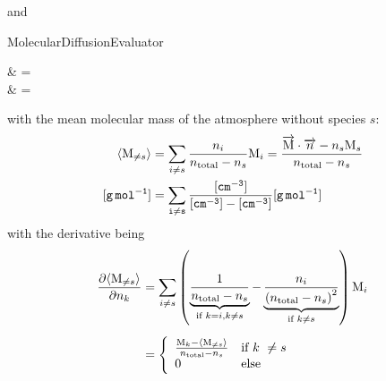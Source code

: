 and
\begin{equationCode}{MolecularDiffusionEvaluator}
\begin{split}
    & =   \\
\uu \frac{[cm^2\,s^{-1}]}{[K]} & \uu = \frac{[cm^2\,s^{-1}]}{[K]} \frac{[cm^2\,s^{-1}]}{[cm^2\,s^{-1}]}
\end{split}
\label{Titan:Ds-tilde_dT}
\end{equationCode}
with  the mean molecular mass of the atmosphere without
species $s$:
\begin{equation}
\begin{split}
\langle\text{M}_{\neq s}\rangle &  = \sum_{i\neq s} \frac{n_i}{n_\text{total} - n_s}\text{M}_i
                       = \frac{\overrightarrow{\text{M}}\cdot\overrightarrow{n} - n_s\text{M}_s}{n_\text{total} - n_s} \\
\tt [g\,mol^{-1}]   & \tt = \sum_{i\neq s} \frac{[cm^{-3}]}{[cm^{-3}] - [cm^{-3}]}[g\,mol^{-1}] \\
\end{split}
\end{equation}
with the derivative being
\begin{equation}
\begin{split}
\doverd{\mean{\Mm_{\neq s}}}{\conc_k} & = \sum_{i\neq s}\left(\underbrace{\frac{1}{\concAtm - \conc_s}}_{\text{if } k = i, k\neq s}
                                                              - \underbrace{\frac{\conc_i}{\left(\concAtm - \conc_s\right)^2}}_{\text{if } k \neq s}\right)\Mm_i \\[5pt]
                                      & = \left\{\begin{array}{ll}
                                           \frac{\Mm_k - \mean{\Mm_{\neq s}}}{\concAtm - \conc_s}
                                                                &  \text{if } k  \neq s \\
                                              0                 &   \text{else}
                                          \end{array}\right.
\end{split}
\end{equation}

